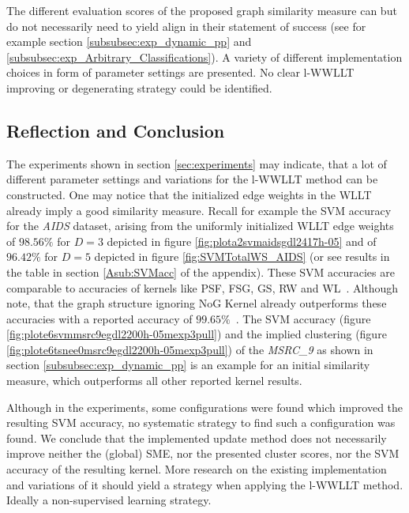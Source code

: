	    The different evaluation scores of the proposed graph similarity measure can but do not necessarily need to yield align in their statement of success (see for example section \ref{subsubsec:exp_dynamic_pp} and \ref{subsubsec:exp_Arbitrary_Classifications}).
	    A variety of different implementation choices in form of parameter settings are presented.
	    No clear l-WWLLT improving or degenerating strategy could be identified.
    
   \subsection{Reflection and Conclusion} \label{subsec:reflection}
   
	   The experiments shown in section \ref{sec:experiments} may indicate, that a lot of different parameter settings and variations for the l-WWLLT method can be constructed.
	   One may notice that the initialized edge weights in the WLLT already imply a good similarity measure.
	   Recall for example the SVM accuracy for the \textit{AIDS} dataset, arising from the uniformly initialized WLLT edge weights of $98.56\%$ for $D=3$ depicted in figure \ref{fig:plota2svmaidsgdl2417h-05}	   	   	   
	   and of $96.42\%$ for $D=5$ depicted in figure \ref{fig:SVMTotalWS_AIDS} (or see results in the table in section \ref{Asub:SVMacc} of the appendix).	   
	   These SVM accuracies are comparable to accuracies of kernels like PSF, FSG, GS, RW and WL~\cite{2019_Schulz_CONF}.
	   Although note, that the graph structure ignoring NoG Kernel already outperforms these accuracies with a reported accuracy of $99.65\%$~\cite{2019_Schulz_CONF}.
	   The SVM accuracy (figure \ref {fig:plote6svmmsrc9egdl2200h-05mexp3pull}) and the implied clustering (figure \ref{fig:plote6tsnee0msrc9egdl2200h-05mexp3pull}) of the \textit{MSRC\_9} as shown in section \ref{subsubsec:exp_dynamic_pp} is an example for an initial similarity measure, which outperforms all other reported kernel results.
	   	   
	   Although in the experiments, some configurations were found which improved the resulting SVM accuracy, no systematic strategy to find such a configuration was found.
	   We conclude that the implemented update method does not necessarily improve neither the (global) SME, nor the presented cluster scores, nor the SVM accuracy of the resulting kernel.
	   More research on the existing implementation and variations of it should yield a strategy when applying the l-WWLLT method.
	   Ideally a non-supervised learning strategy.
	   